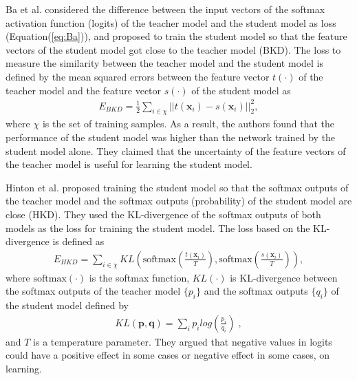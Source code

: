 \documentclass[conference]{IEEEtran}
\begin{document}
Ba et al. \cite{Ba2014} considered the difference between the input vectors of the softmax activation function (logits) of the teacher model and the student model as loss (Equation(\ref{eq:Ba})), and proposed to train the student model so that the feature vectors of the student model got close to the teacher model (BKD).
The loss to measure the similarity between the teacher model and the student model is defined by the mean squared errors between the feature vector $t(\cdot)$ of the teacher model and the feature vector $s(\cdot)$ of the student model as 
\begin{align} \label{eq:Ba}
E_{BKD}= \frac{1}{2}\sum_{i \in \chi} ||t(\bm{x}_i) - s(\bm{x}_i)||^2_2,
\end{align}
where $\chi$ is the set of training samples.
As a result, the authors found that the performance of the student model was higher than the network trained by the student model alone.
They claimed that the uncertainty of the feature vectors of the teacher model is useful for learning the student model.

Hinton et al. \cite{Hinton2015} proposed training the student model so that the softmax outputs of the teacher model and the softmax outputs (probability) of the student model are close (HKD).
They used the KL-divergence of the softmax outputs of both models as the loss for training the student model.
The loss based on the KL-divergence is defined as
\begin{align} \label{eq:Hinton}
    E_{HKD} = \sum_{i \in \chi} KL(\mbox{softmax}(\frac{t(\bm{x}_i)}{T}), \mbox{softmax}(\frac{s(\bm{x}_i)}{T})),
\end{align}
where $\mbox{softmax}(\cdot)$ is the softmax function,
$KL(\cdot)$ is KL-divergence between the softmax outputs of the teacher model $\{p_i\}$ and the softmax outputs $\{q_i\}$ of the student model defined by
\begin{align} \label{eq:KL-divergence}
KL(\bm{p}, \bm{q}) = \sum_{i} p_i log(\frac{p_i}{q_i}) \; ,
\end{align}
and $T$ is a temperature parameter.
They argued that negative values in logits could have a positive effect in some cases or negative effect in some cases, on learning.
\end{document}
